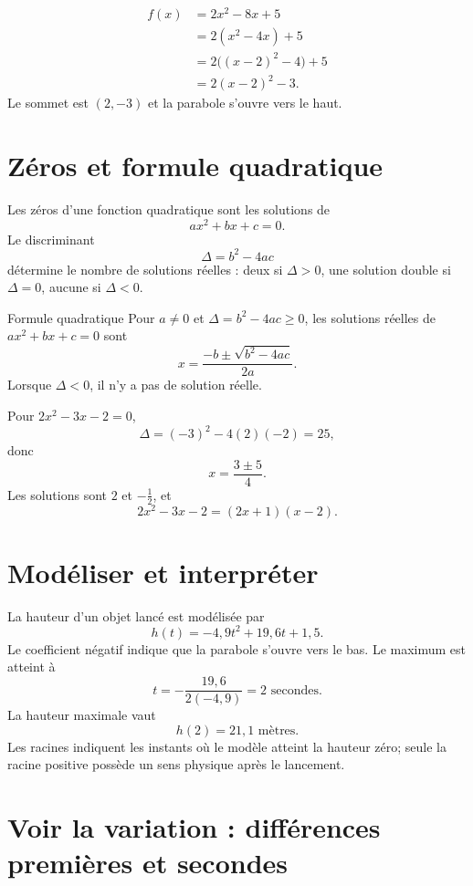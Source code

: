 \documentclass[12pt,a4paper,openany]{book}
\begin{document}
\begin{examplebox}
\begin{align*}
f(x)&=2x^2-8x+5\\
&=2(x^2-4x)+5\\
&=2\bigl((x-2)^2-4\bigr)+5\\
&=2(x-2)^2-3.
\end{align*}
Le sommet est $(2,-3)$ et la parabole s'ouvre vers le haut.
\end{examplebox}

\section{Zéros et formule quadratique}

Les zéros d'une fonction quadratique sont les solutions de
\[
ax^2+bx+c=0.
\]
Le discriminant
\[
\Delta=b^2-4ac
\]
détermine le nombre de solutions réelles : deux si $\Delta>0$, une solution double si $\Delta=0$, aucune si $\Delta<0$.

\begin{theorem}{Formule quadratique}{}
Pour $a\neq0$ et $\Delta=b^2-4ac\geq0$, les solutions réelles de $ax^2+bx+c=0$ sont
\[
x=\frac{-b\pm\sqrt{b^2-4ac}}{2a}.
\]
Lorsque $\Delta<0$, il n'y a pas de solution réelle.
\end{theorem}

\begin{examplebox}
Pour $2x^2-3x-2=0$,
\[
\Delta=(-3)^2-4(2)(-2)=25,
\]
donc
\[
x=\frac{3\pm5}{4}.
\]
Les solutions sont $2$ et $-\frac12$, et
\[
2x^2-3x-2=(2x+1)(x-2).
\]
\end{examplebox}

\section{Modéliser et interpréter}

\begin{examplebox}
La hauteur d'un objet lancé est modélisée par
\[
h(t)=-4{,}9t^2+19{,}6t+1{,}5.
\]
Le coefficient négatif indique que la parabole s'ouvre vers le bas. Le maximum est atteint à
\[
t=-\frac{19{,}6}{2(-4{,}9)}=2\text{ secondes}.
\]
La hauteur maximale vaut
\[
h(2)=21{,}1\text{ mètres}.
\]
Les racines indiquent les instants où le modèle atteint la hauteur zéro; seule la racine positive possède un sens physique après le lancement.
\end{examplebox}


\section{Voir la variation : différences premières et secondes}
\end{document}

